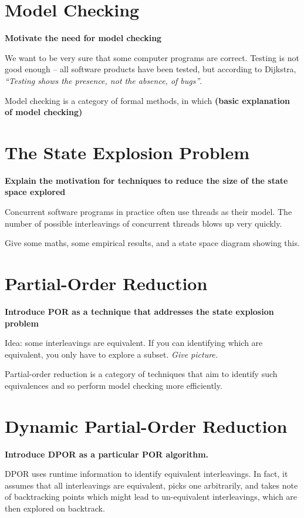 \documentclass[12pt,a4paper,twoside,openright]{report}
\begin{document}
\section{Model Checking}
\textbf{Motivate the need for model checking}

We want to be very sure that some computer
programs are correct. Testing is not good
enough -- all software products have been
tested, but according to Dijkstra,
\emph{``Testing shows the presence,
	not the absence, of bugs''}.

Model checking is a category of formal
methods, in which \textbf{(basic explanation of
model checking)}

\section{The State Explosion Problem}
\textbf{Explain the motivation for techniques
	to reduce the size of the state space explored}

Concurrent software programs in practice often
use threads as their model. The number of possible
interleavings of concurrent threads blows up very 
quickly.

Give some maths, some empirical results,
and a state space diagram showing this.

\section{Partial-Order Reduction}
\textbf{Introduce POR as a technique that
	addresses the state explosion problem}

Idea: some interleavings are equivalent. If you
can identifying which are equivalent, you only
have to explore a subset. \emph{Give picture.}

Partial-order reduction is a category of techniques
that aim to identify such equivalences and so
perform model checking more efficiently.

\section{Dynamic Partial-Order Reduction}
\textbf{Introduce DPOR as a particular
	POR algorithm.}

DPOR uses runtime information to identify
equivalent interleavings. In fact, it assumes
that all interleavings are equivalent, picks
one arbitrarily, and takes note of backtracking
points which might lead to un-equivalent
interleavings, which are then explored on
backtrack.
\end{document}
